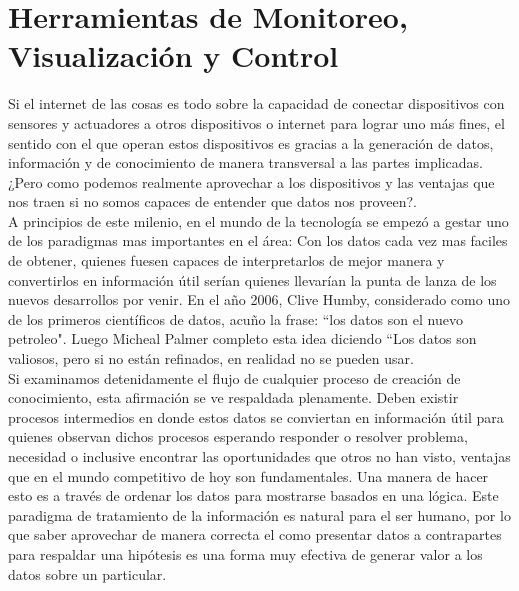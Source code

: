 

\chapter{Herramientas de Monitoreo, Visualización y Control}
Si el internet de las cosas es todo sobre la capacidad de conectar dispositivos con sensores y actuadores a otros dispositivos o internet para lograr uno más fines, el sentido con el que operan estos dispositivos es gracias a la generación de datos, información y de conocimiento de manera transversal a las partes implicadas. ¿Pero como podemos realmente aprovechar a los dispositivos y las ventajas que nos traen si no somos capaces de entender que datos nos proveen?.\\

A principios de este milenio, en el mundo de la tecnología se empezó a gestar uno de los paradigmas mas importantes en el área: Con los datos cada vez mas faciles de obtener, quienes fuesen capaces de interpretarlos de mejor manera y convertirlos en información útil serían quienes llevarían la punta de lanza de los nuevos desarrollos por venir. En el año 2006, Clive Humby, considerado como uno de los primeros científicos de datos, acuño la frase: ``los datos son el nuevo petroleo". Luego Micheal Palmer completo esta idea diciendo ``Los datos son  valiosos, pero si no están refinados, en realidad no se pueden usar\cite{datosPetroleo}.\\

Si examinamos detenidamente el flujo de cualquier proceso de creación de conocimiento, esta afirmación se ve respaldada plenamente. Deben existir procesos intermedios en donde estos datos se conviertan en información útil para quienes observan dichos procesos esperando responder o resolver problema, necesidad o inclusive encontrar las oportunidades que otros no han visto, ventajas que en el mundo competitivo de hoy son fundamentales. Una manera de hacer esto es a través de ordenar los datos para mostrarse basados en una lógica. Este paradigma de tratamiento de la información es natural para el ser humano, por lo que saber aprovechar de manera correcta el como presentar datos a contrapartes para respaldar una hipótesis es una forma muy efectiva de generar valor a los datos sobre un particular.\\


